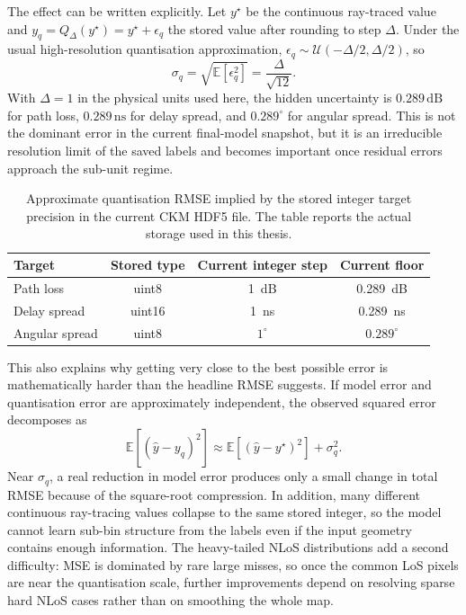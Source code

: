 The effect can be written explicitly. Let \(y^\star\) be the continuous
ray-traced value and \(y_q = Q_\Delta(y^\star) = y^\star + \epsilon_q\) the
stored value after rounding to step \(\Delta\). Under the usual high-resolution
quantisation approximation, \(\epsilon_q \sim \mathcal{U}(-\Delta/2,\Delta/2)\),
so
\begin{equation}
  \sigma_q = \sqrt{\mathbb{E}[\epsilon_q^2]}
           = \frac{\Delta}{\sqrt{12}}.
  \label{eq:quant_floor}
\end{equation}
With \(\Delta=1\) in the physical units used here, the hidden uncertainty is
\(0.289\,\mathrm{dB}\) for path loss, \(0.289\,\mathrm{ns}\) for delay spread,
and \(0.289^\circ\) for angular spread. This is not the dominant error in the
current final-model snapshot, but it is an irreducible resolution limit of the saved
labels and becomes important once residual errors approach the sub-unit regime.

\begin{table}[H]
\centering
\caption[Approximate RMSE floor from target quantisation.]%
{Approximate quantisation RMSE implied by the stored integer target
precision in the current CKM HDF5 file. The table reports the actual storage
used in this thesis.}
\label{tab:quantisation_floor}
\begin{tabular}{lccc}
\toprule
Target & Stored type & Current integer step & Current floor \\
\midrule
Path loss & uint8 & \SI{1}{dB} & \SI{0.289}{dB} \\
Delay spread & uint16 & \SI{1}{ns} & \SI{0.289}{ns} \\
Angular spread & uint8 & \(1^\circ\) & \(0.289^\circ\) \\
\bottomrule
\end{tabular}
\end{table}

This also explains why getting very close to the best possible error is
mathematically harder than the headline RMSE suggests. If model error and
quantisation error are approximately independent, the observed squared error
decomposes as
\[
  \mathbb{E}\!\left[(\hat{y}-y_q)^2\right]
  \approx
  \mathbb{E}\!\left[(\hat{y}-y^\star)^2\right] + \sigma_q^2 .
\]
Near \(\sigma_q\), a real reduction in model error produces only a small change
in total RMSE because of the square-root compression. In addition, many
different continuous ray-tracing values collapse to the same stored integer, so
the model cannot learn sub-bin structure from the labels even if the input
geometry contains enough information. The heavy-tailed NLoS distributions add a
second difficulty: MSE is dominated by rare large misses, so once the common
LoS pixels are near the quantisation scale, further improvements depend on
resolving sparse hard NLoS cases rather than on smoothing the whole map.

